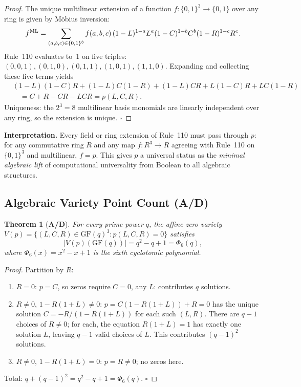\documentclass[11pt]{article}
\newtheorem{theorem}{Theorem}[section]
\theoremstyle{remark}
\newcommand{\GF}[1]{\ensuremath{\mathrm{GF}(#1)}}
\newcommand{\CatAD}{\textbf{A/D}}
\begin{document}
\begin{proof}
The unique multilinear extension of a function $f:\{0,1\}^3 \to \{0,1\}$ over any
ring is given by M\"obius inversion:
\[
f^{\rm ML} = \sum_{(a,b,c)\in\{0,1\}^3} f(a,b,c)\,
  (1-L)^{1-a}L^a(1-C)^{1-b}C^b(1-R)^{1-c}R^c.
\]
Rule~110 evaluates to~1 on five triples:
$(0,0,1),(0,1,0),(0,1,1),(1,0,1),(1,1,0)$.
Expanding and collecting these five terms yields
\begin{align*}
  &(1{-}L)(1{-}C)R + (1{-}L)C(1{-}R) + (1{-}L)CR + L(1{-}C)R + LC(1{-}R) \\
  &\quad = C + R - CR - LCR = p(L,C,R).
\end{align*}
Uniqueness: the $2^3 = 8$ multilinear basis monomials are linearly independent over
any ring, so the extension is unique. $\square$
\end{proof}

\noindent\textbf{Interpretation.} Every field or ring extension of Rule~110 must pass
through $p$: for any commutative ring $R$ and any map $f: R^3 \to R$ agreeing with
Rule~110 on $\{0,1\}^3$ and multilinear, $f = p$. This gives $p$ a universal status
as the \emph{minimal algebraic lift} of computational universality from Boolean to all
algebraic structures.

\subsection{Algebraic Variety Point Count (\CatAD{})}

\begin{theorem}[\CatAD{}]
\label{thm:phi6}
For every prime power $q$, the affine zero variety
$V(p) = \{(L,C,R)\in\GF{q}^3 : p(L,C,R) = 0\}$
satisfies
\[
  |V(p)(\GF{q})| = q^2 - q + 1 = \Phi_6(q),
\]
where $\Phi_6(x) = x^2 - x + 1$ is the sixth cyclotomic polynomial.
\end{theorem}

\begin{proof}
Partition by $R$:
\begin{enumerate}[leftmargin=2em,itemsep=2pt,label=(\roman*)]
  \item $R = 0$: $p = C$, so zeros require $C = 0$, any $L$: contributes $q$ solutions.
  \item $R \neq 0$, $1 - R(1+L) \neq 0$: $p = C(1 - R(1+L)) + R = 0$ has the unique
    solution $C = -R\big/(1 - R(1+L))$ for each such $(L,R)$.
    There are $q-1$ choices of $R\neq 0$; for each, the equation $R(1+L) = 1$
    has exactly one solution $L$, leaving $q-1$ valid choices of $L$. This
    contributes $(q-1)^2$ solutions.
  \item $R \neq 0$, $1 - R(1+L) = 0$: $p = R \neq 0$; no zeros here.
\end{enumerate}
Total: $q + (q-1)^2 = q^2 - q + 1 = \Phi_6(q)$. $\square$
\end{proof}
\end{document}
